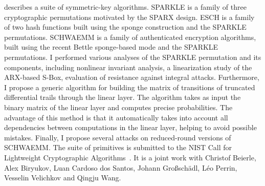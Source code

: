 \textbf{} describes a suite of symmetric-key algorithms. SPARKLE is a family of three cryptographic permutations motivated by the SPARX design. ESCH is a family of two hash functions built using the sponge construction and the SPARKLE permutations. SCHWAEMM is a family of authenticated encryption algorithms, built using the recent Bettle sponge-based mode and the SPARKLE permutations. I performed various analyses of the SPARKLE permutation and its components, including nonlinear invariant analysis, a linearization study of the ARX-based S-Box, evaluation of resistance against integral attacks. Furthermore, I propose a generic algorithm for building the matrix of transitions of truncated differential trails through the linear layer. The algorithm takes as input the binary matrix of the linear layer and computes precise probabilities. The advantage of this method is that it automatically takes into account all dependencies between computations in the linear layer, helping to avoid possible mistakes. Finally, I propose several attacks on reduced-round versions of SCHWAEMM. The suite of primitives is submitted to the NIST Call for Lightweight Cryptographic Algorithms~\cite{NISTlight}. It is a joint work with Christof Beierle, Alex Biryukov, Luan Cardoso dos Santos, Johann Großschädl, Léo Perrin, Vesselin Velichkov and Qingju Wang.